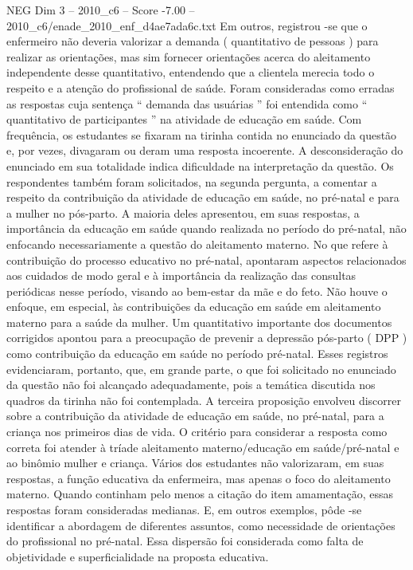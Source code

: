 \begin{textsample}{NEG Dim 3 – 2010\_c6 – Score -7.00 – 2010\_c6/enade\_2010\_enf\_d4ae7ada6c.txt}
Em outros, registrou -se que o enfermeiro não deveria valorizar a demanda ( quantitativo de pessoas ) para realizar as orientações, mas sim fornecer orientações acerca do aleitamento independente desse quantitativo, entendendo que a clientela merecia todo o respeito e a atenção do profissional de saúde.
Foram consideradas como erradas as respostas cuja sentença “ demanda das usuárias ” foi entendida como “ quantitativo de participantes ” na atividade de educação em saúde.
Com frequência, os estudantes se fixaram na tirinha contida no enunciado da questão e, por vezes, divagaram ou deram uma resposta incoerente.
A desconsideração do enunciado em sua totalidade indica dificuldade na interpretação da questão.
Os respondentes também foram solicitados, na segunda pergunta, a comentar a respeito da contribuição da atividade de educação em saúde, no pré-natal e para a mulher no pós-parto.
A maioria deles apresentou, em suas respostas, a importância da educação em saúde quando realizada no período do pré-natal, não enfocando necessariamente a questão do aleitamento materno.
No que refere à contribuição do processo educativo no pré-natal, apontaram aspectos relacionados aos cuidados de modo geral e à importância da realização das consultas periódicas nesse período, visando ao bem-estar da mãe e do feto.
Não houve o enfoque, em especial, às contribuições da educação em saúde em aleitamento materno para a saúde da mulher.
Um quantitativo importante dos documentos corrigidos apontou para a preocupação de prevenir a depressão pós-parto ( DPP ) como contribuição da educação em saúde no período pré-natal.
Esses registros evidenciaram, portanto, que, em grande parte, o que foi solicitado no enunciado da questão não foi alcançado adequadamente, pois a temática discutida nos quadros da tirinha não foi contemplada.
A terceira proposição envolveu discorrer sobre a contribuição da atividade de educação em saúde, no pré-natal, para a criança nos primeiros dias de vida.
O critério para considerar a resposta como correta foi atender à tríade aleitamento materno/educação em saúde/pré-natal e ao binômio mulher e criança.
Vários dos estudantes não valorizaram, em suas respostas, a função educativa da enfermeira, mas apenas o foco do aleitamento materno.
Quando continham pelo menos a citação do item amamentação, essas respostas foram consideradas medianas.
E, em outros exemplos, pôde -se identificar a abordagem de diferentes assuntos, como necessidade de orientações do profissional no pré-natal.
Essa dispersão foi considerada como falta de objetividade e superficialidade na proposta educativa.

\end{textsample}
